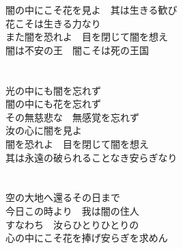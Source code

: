 \documentclass[リボン]{genkou}
\begin{document}
\begin{ribon} 
　闇の中にこそ花を見よ　其は生きる歓び \\
　花こそは生きる力なり \\
　また闇を恐れよ　目を閉じて闇を想え \\
　闇は不安の王　闇こそは死の王国 \\
　\\
　\\
　光の中にも闇を忘れず \\
　闇の中にも花を忘れず \\
　その無慈悲な　無感覚を忘れず \\
　汝の心に闇を見よ \\
　闇を恐れよ　目を閉じて闇を想え \\
　其は永遠の破られることなき安らぎなり \\
　\\
　\\
　空の大地へ還るその日まで \\
　今日この時より　我は闇の住人 \\
　すなわち　汝らひとりひとりの \\
　心の中にこそ花を捧げ安らぎを求めん
\end{ribon}
\end{document}
